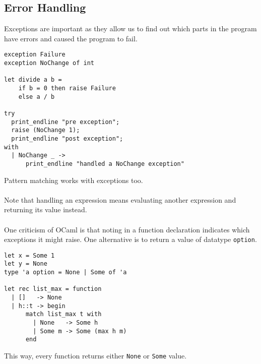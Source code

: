 \documentclass[12pt,a4paper]{article} %
\begin{document}
\subsection{Error Handling}
Exceptions are important as they allow us to find out which parts in the program have errors and caused the program to fail.
\begin{lstlisting}[language=caml]
exception Failure
exception NoChange of int

let divide a b = 
	if b = 0 then raise Failure
	else a / b
	
try
  print_endline "pre exception";
  raise (NoChange 1);
  print_endline "post exception";
with
  | NoChange _ ->
      print_endline "handled a NoChange exception"
\end{lstlisting}
Pattern matching works with exceptions too.
\\\\
Note that handling an expression means evaluating another expression and returning its value instead. 
\\\\
One criticism of OCaml is that noting in a function declaration indicates which exceptions it might raise. One alternative is to return a value of datatype \verb|option|.
\begin{lstlisting}[language=caml]
let x = Some 1
let y = None
type 'a option = None | Some of 'a

let rec list_max = function
  | []   -> None
  | h::t -> begin
      match list_max t with
        | None   -> Some h
        | Some m -> Some (max h m)
      end
\end{lstlisting}
This way, every function returns either \verb|None| or \verb|Some| value.
\end{document}

